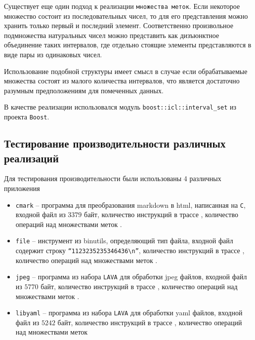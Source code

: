 Существует еще один подход к реализации \texttt{множества меток}. Если некоторое множество состоит из последовательных чисел, то для его представления можно хранить только первый и последний элемент. Соответственно произвольное подмножества натуральных чисел можно представить как дизъюнктное объединение таких интервалов, где отдельно стоящие элементы представляются в виде пары из одинаковых чисел.

Использование подобной структуры имеет смысл в случае если обрабатываемые множества состоят из малого количества интервалов, что является достаточно разумным предположениям для помеченных данных.

В качестве реализации использовался модуль \texttt{boost::icl::interval\_set} из проекта \texttt{Boost}.


\subsection{Тестирование производительности различных реализаций}

Для тестирования производительности были использованы 4 различных приложения

\begin{itemize}
    \item \texttt{cmark} -- программа для преобразования markdown в html, написанная на \texttt{C}, входной файл из $3379$ байт, количество инструкций в трассе , количество операций над множествами меток .
    \item \texttt{file} -- инструмент из binutils, определяющий тип файла, входной файл содержит строку \texttt{``1123235235346436\textbackslash n''}, количество инструкций в трассе , количество операций над множествами меток .
    \item \texttt{jpeg} -- программа из набора \texttt{LAVA} \cite{LAVA} для обработки jpeg файлов, входной файл из $5770$ байт, количество инструкций в трассе , количество операций над множествами меток .
    \item \texttt{libyaml} -- программа из набора \texttt{LAVA} для обработки yaml файлов, входной файл из $5242$ байт, количество инструкций в трассе , количество операций над множествами меток 
\end{itemize}

